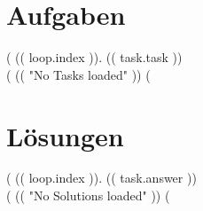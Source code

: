 \documentclass[a4paper,12pt]{article}
\begin{document}
\section*{Aufgaben}
(%
    \noindent
    (( loop.index )). (( task.task )) \\
(%
    (( "No Tasks loaded" ))
(%

\newpage

\section*{Lösungen}
(%
    \noindent
    (( loop.index )). (( task.answer )) \\
(%
    (( "No Solutions loaded" ))
(%
\end{document}
